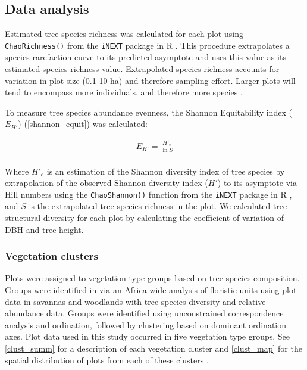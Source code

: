 \documentclass[11pt,a4paper]{article}
\begin{document}
\subsection{Data analysis}
Estimated tree species richness was calculated for each plot using \verb|ChaoRichness()| from the \verb|iNEXT| package in R \citep{Hsieh2016}. This procedure extrapolates a species rarefaction curve to its predicted asymptote and uses this value as its estimated species richness value. Extrapolated species richness accounts for variation in plot size (0.1-10 ha) and therefore sampling effort. Larger plots will tend to encompass more individuals, and therefore more species \citep{Dengler2009}.

To measure tree species abundance evenness, the Shannon Equitability index ($E_{H'}$) \citep{Smith1996} (\autoref{shannon_equit}) was calculated: 

\begin{equation}
	\begin{gathered}
		E_{H'} = \frac{H'_{e}}{\ln{S}} \\
	\end{gathered}
	\label{shannon_equit}
\end{equation}

Where $H'_{e}$ is an estimation of the Shannon diversity index of tree species by extrapolation of the observed Shannon diversity index ($H'$) to its asymptote via Hill numbers using the \verb|ChaoShannon()| function from the \verb|iNEXT| package in R \citep{Hsieh2016}, and $S$ is the extrapolated tree species richness in the plot. We calculated tree structural diversity for each plot by calculating the coefficient of variation of DBH and tree height. 

\subsubsection{Vegetation clusters}

Plots were assigned to vegetation type groups based on tree species composition. Groups were identified in \citet{Fayolle2018} via an Africa wide analysis of floristic units using plot data in savannas and woodlands with tree species diversity and relative abundance data. Groups were identified using unconstrained correspondence analysis and ordination, followed by clustering based on dominant ordination axes. Plot data used in this study occurred in five vegetation type groups. See \autoref{clust_summ} for a description of each vegetation cluster and \autoref{clust_map} for the spatial distribution of plots from each of these clusters .
\end{document}
